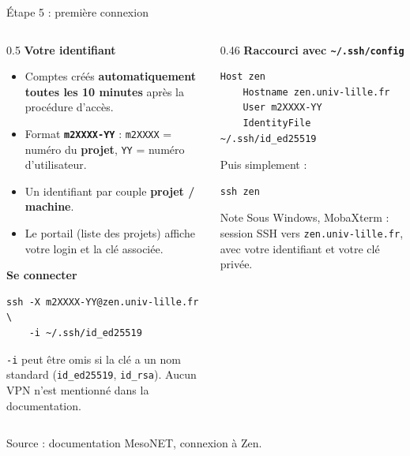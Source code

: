 \documentclass[8pt,aspectratio=169]{beamer}
\newcommand{\src}[1]{\vfill{\tiny\color{gray}Source : #1\par}}
\begin{document}
\begin{frame}[fragile]{Étape 5 : première connexion}
\begin{columns}[T]
\begin{column}{0.5\textwidth}
\textbf{Votre identifiant}
\begin{itemize}
\item Comptes créés \textbf{automatiquement toutes les 10 minutes} après la procédure d'accès.
\item Format \textbf{\texttt{m2XXXX-YY}} : \texttt{m2XXXX} = numéro du \textbf{projet}, \texttt{YY} = numéro d'utilisateur.
\item Un identifiant par couple \textbf{projet / machine}.
\item Le portail (liste des projets) affiche votre login et la clé associée.
\end{itemize}

\medskip
\textbf{Se connecter}
\begin{verbatim}
ssh -X m2XXXX-YY@zen.univ-lille.fr \
    -i ~/.ssh/id_ed25519
\end{verbatim}
\texttt{-i} peut être omis si la clé a un nom standard (\texttt{id\_ed25519}, \texttt{id\_rsa}). Aucun VPN n'est mentionné dans la documentation.
\end{column}
\begin{column}{0.46\textwidth}
\textbf{Raccourci avec \texttt{\textasciitilde/.ssh/config}}
\begin{verbatim}
Host zen
    Hostname zen.univ-lille.fr
    User m2XXXX-YY
    IdentityFile ~/.ssh/id_ed25519
\end{verbatim}
Puis simplement :
\begin{verbatim}
ssh zen
\end{verbatim}
\begin{block}{Note}
Sous Windows, MobaXterm : session SSH vers \texttt{zen.univ-lille.fr}, avec votre identifiant et votre clé privée.
\end{block}
\end{column}
\end{columns}
\src{documentation MesoNET, \og connexion \fg{} à Zen.}
\end{frame}
\end{document}
